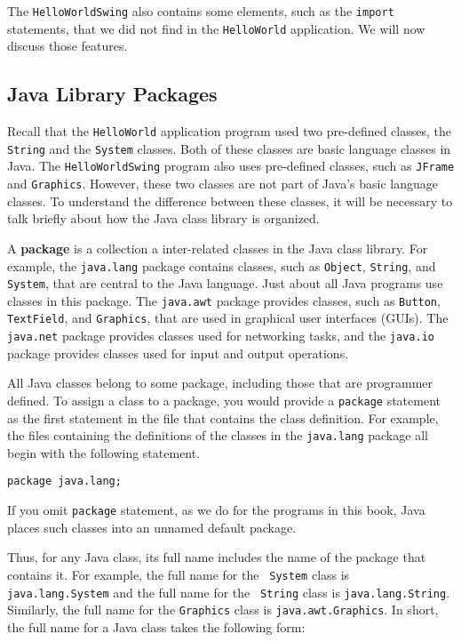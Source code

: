 The {\tt HelloWorldSwing} also contains some elements, such as the
{\tt import} statements, that we did not find in the {\tt HelloWorld}
application. We will now discuss those features.


\subsection{Java Library Packages} 

Recall that the {\tt HelloWorld} application program used two
pre-defined classes, the {\tt String} and the {\tt System}
classes. Both of these classes are basic language classes in Java.
The {\tt HelloWorldSwing} program also uses pre-defined classes, such
as {\tt JFrame} and {\tt Graphics}. However, these two classes are not
part of Java's basic language classes.  To understand the difference
between these classes, it will be necessary to talk briefly about
how the Java class library is organized.

A {\bf package} is a collection a inter-related classes in the Java
class library. For example, the {\tt java.lang} package contains
classes, such as {\tt Object}, {\tt String}, and {\tt System}, that
are central to the Java language. Just about all Java programs use
classes in this package. The {\tt java.awt} package provides classes,
such as {\tt Button}, {\tt TextField}, and {\tt Graphics}, that are
used in graphical user interfaces (GUIs).  The {\tt java.net} package
provides classes used for networking tasks, and the {\tt java.io}
package provides classes used for input and output operations.

All Java classes belong to some package, including those that are
programmer defined. To assign a class to a package, you would provide
a {\tt package} statement as the first statement in the file that
contains the class definition. For example, the files containing the
definitions of the classes in the {\tt java.lang} package all begin
with the following statement.

\begin{jjjlisting}
\begin{lstlisting}
package java.lang;
\end{lstlisting}
\end{jjjlisting}

\noindent If you omit {\tt package} statement, as we do for the
programs in this book, Java places such classes into an unnamed
default package. 

Thus, for any Java class, its full name includes the name of the
package that contains it. For example, the full name for the {\tt
System} class is {\tt java.lang.System} and the full name for the {\tt
String} class is {\tt java.lang.String}.  Similarly, the full name for
the {\tt Graphics} class is {\tt java.awt.Graphics}.  In short, the
full name for a Java class takes the following form:

